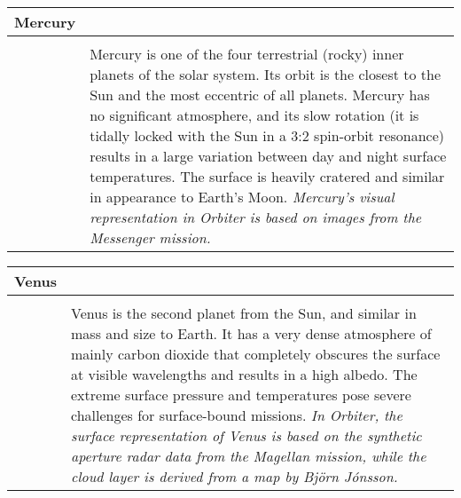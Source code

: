 \documentclass[Orbiter User Manual.tex]{subfiles}
\begin{document}
\begin{table}[H]
	\begin{tabularx}{\textwidth}{ |lX| }
	\hline\rule{0pt}{2ex}
	\textbf{Mercury} &\\
	\hline\rule{0pt}{2ex}
	\adjustbox{valign=t}{
		\begin{tabular}{ c }
		\texttt{[image: solsys\_mercury.jpg]}\\
		\end{tabular}
		}
	& \vfill
	Mercury is one of the four terrestrial (rocky) inner planets of the solar system. Its orbit is the closest to the Sun and the most eccentric of all planets.\newline
		Mercury has no significant atmosphere, and its slow rotation (it is tidally locked with the Sun in a 3:2 spin-orbit resonance) results in a large variation between day and night surface temperatures. The surface is heavily cratered and similar in appearance to Earth's Moon.\newline
		\newline
		\textit{Mercury's visual representation in Orbiter is based on images from the Messenger mission.}\\
	\hline
	\end{tabularx}
\end{table}


\begin{table}[H]
	\begin{tabularx}{\textwidth}{ |lX| }
	\hline\rule{0pt}{2ex}
	\textbf{Venus} &\\
	\hline\rule{0pt}{2ex}
	\adjustbox{valign=t}{
		\begin{tabular}{ c }
		\texttt{[image: solsys\_venus.jpg]}\\
		\end{tabular}
		}
	& \vfill
	Venus is the second planet from the Sun, and similar in mass and size to Earth. It has a very dense atmosphere of mainly carbon dioxide that completely obscures the surface at visible wavelengths and results in a high albedo. The extreme surface pressure and temperatures pose severe challenges for surface-bound missions.\newline
		\newline
		\textit{In Orbiter, the surface representation of Venus is based on the synthetic aperture radar data from the Magellan mission, while the cloud layer is derived from a map by Björn Jónsson.}\\
	\hline
	\end{tabularx}
\end{table}
\end{document}
